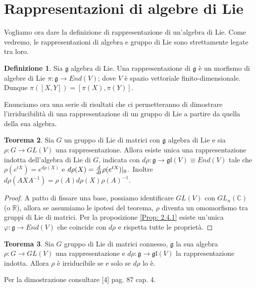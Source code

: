 \documentclass[12pt,a4paper]{report}
\theoremstyle{definition}
\newtheorem{Def}{Definizione}[chapter]
\theoremstyle{Theorem}
\newtheorem{Theo}[Def]{Teorema}
\theoremstyle{definition}
\theoremstyle{definition}
\theoremstyle{definition}
\begin{document}
\section{Rappresentazioni di algebre di Lie}
Vogliamo ora dare la definizione di rappresentazione di un'algebra di Lie. Come vedremo, le rappresentazioni di algebra e gruppo di Lie sono strettamente legate tra loro.
\begin{Def}
	Sia $\mathfrak{g}$ algebra di Lie. Una rappresentazione di $\mathfrak{g}$ è un morfismo di algebre di Lie $\pi:\mathfrak{g}\rightarrow End(V)$; dove $V$ è spazio vettoriale finito-dimensionale. Dunque $\pi([X,Y])=[\pi(X),\pi(Y)]$.
\end{Def}
\begin{comment}
Così come per i gruppi, anche per le algebre abbiamo l'equivalenza tra le nozioni di azioni e gruppi. Infatti, data una rappresentazione.
\end{comment}
Enunciamo ora una serie di risultati che ci permetteranno di dimostrare l'irriducibilità di una rappresentazione di un gruppo di Lie a partire da quella della sua algebra.
\begin{Theo}
	Sia $G$ un gruppo di Lie di matrici con $\mathfrak{g}$ algebra di Lie e sia $\rho:G\rightarrow GL(V)$ una rappresentazione. Allora esiste unica una rappresentazione indotta dell'algebra di Lie di $G$, indicata con $d\rho:\mathfrak{g}\rightarrow \mathfrak{gl}(V)\equiv End(V)$ tale che $\rho(e^{tX})=e^{d\rho(X)}$ e $d\rho(X)={d\over dt}\rho(e^{tX})|_0$.\
	Inoltre $d\rho(AXA^{-1})=\rho(A)d\rho(X)\rho(A)^{-1}$.	
\end{Theo}
\begin{proof}
	A patto di fissare una base, possiamo identificare $GL(V)$ con $GL_n(\mathbb{C})$ (o $\mathbb{R}$), allora se assumiamo le ipotesi del teorema, $\rho$ diventa un omomorfismo tra gruppi di Lie di matrici. Per la proposizione \ref{Prop: 2.4.1} esiste un'unica $\varphi:\mathfrak{g}\rightarrow End(V)$ che coincide con $d\rho$ e rispetta tutte le proprietà.
\end{proof}
\begin{Theo}\label{Theo: 3.1}
	Sia $G$ gruppo di Lie di matrici connesso, $\mathfrak{g}$ la sua algebra $\rho:G\rightarrow GL(V)$ una rappresentazione e $d\rho:\mathfrak{g}\rightarrow \mathfrak{gl}(V)$ la rappresentazione indotta. Allora $\rho$ è irriducibile se e solo se $d\rho$ lo è.
\end{Theo}
Per la dimostrazione consultare [4] pag. 87 cap. 4.\\
\\
\end{document}
